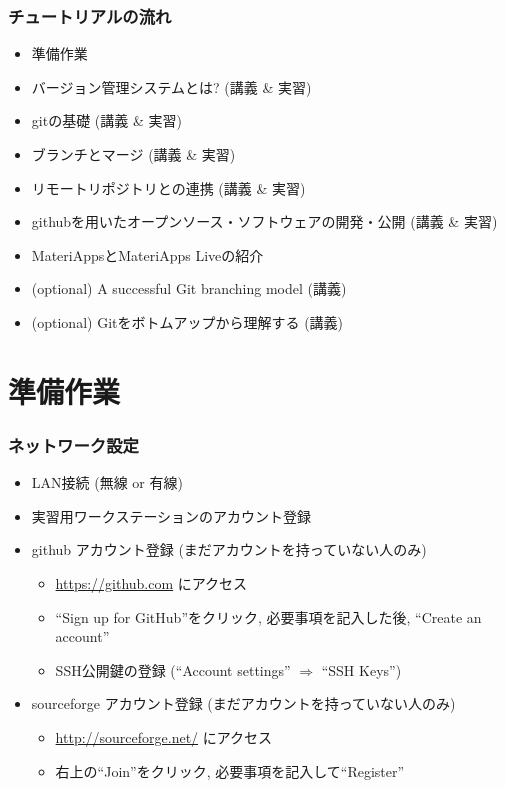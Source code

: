 \begin{frame}
  \frametitle{チュートリアルの流れ}
  \begin{itemize}
  \item 準備作業
  \item バージョン管理システムとは? (講義 \& 実習)
  \item gitの基礎 (講義 \& 実習)
  \item ブランチとマージ (講義 \& 実習)
  \item リモートリポジトリとの連携 (講義 \& 実習)
  \item githubを用いたオープンソース・ソフトウェアの開発・公開 (講義 \& 実習)
  \item MateriAppsとMateriApps Liveの紹介
  \item (optional) A successful Git branching model (講義)
  \item (optional) Gitをボトムアップから理解する (講義)
  \end{itemize}
\end{frame}

\section{準備作業}

\begin{frame}
  \frametitle{ネットワーク設定}
  \begin{itemize}
  \item LAN接続 (無線 or 有線)
  \item 実習用ワークステーションのアカウント登録
  \item github アカウント登録 (まだアカウントを持っていない人のみ)
    \begin{itemize}
    \item \url{https://github.com} にアクセス
    \item ``Sign up for GitHub''をクリック, 必要事項を記入した後, ``Create an account''
    \item SSH公開鍵の登録 (``Account settings'' $\Rightarrow$ ``SSH Keys'')
    \end{itemize} 
  \item sourceforge アカウント登録 (まだアカウントを持っていない人のみ)
    \begin{itemize}
    \item \url{http://sourceforge.net/} にアクセス
    \item 右上の``Join''をクリック, 必要事項を記入して``Register''
    \end{itemize} 
  \end{itemize}
\end{frame}

